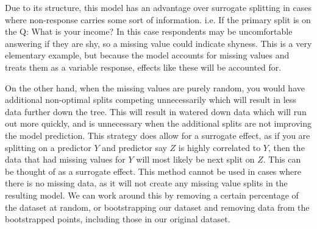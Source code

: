 \documentclass[11pt]{article}
\begin{document}
\vspace{5 mm}
\noindent
Due to its structure, this model has an advantage over surrogate splitting in 
cases where non-response carries some sort of information.  i.e. If the primary 
split is on the Q: What is your income? In this case respondents may be 
uncomfortable answering if they are shy, so a missing value could indicate 
shyness.  This is a very elementary example, but because the model accounts for 
missing values and treats them as a variable response, effects like these will 
be accounted for.  

\vspace{5 mm}
\noindent
On the other hand, when the missing values are purely random, you would have 
additional non-optimal splits competing unnecessarily which will result in less 
data further down the tree.  This will result in watered down data which will 
run out more quickly, and is unnecessary when the additional splits are not 
improving the model prediction.  This strategy does allow for a surrogate 
effect, as if you are splitting on a predictor $Y$ and predictor say  $Z$ is 
highly correlated to $Y$, then the data that had missing values for $Y$ will 
most likely be next split on $Z$.  This can be thought of as a surrogate effect.  
This method cannot be used in cases where there is no missing data, as it will 
not create any missing value splits in the resulting model.  We can work around 
this by removing a certain percentage of the dataset at random, or 
bootstrapping our dataset and removing data from the bootstrapped points, 
including those in our original dataset.
\end{document}
